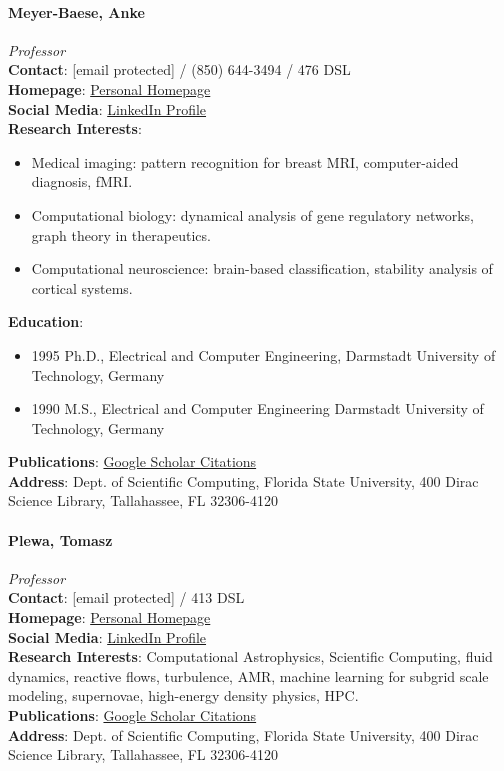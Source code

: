 \documentclass[12pt,a4paper]{article}
\begin{document}
\paragraph{Meyer-Baese, Anke}
\textit{Professor}\\
\textbf{Contact}: [email protected] / (850) 644-3494 / 476 DSL\\
\textbf{Homepage}: \href{http://www.sc.fsu.edu/~ameyerbaese/}{Personal Homepage}\\
\textbf{Social Media}: \href{https://www.linkedin.com/in/anke-meyer-baese-b4a1b87/}{LinkedIn Profile}\\
\textbf{Research Interests}:
\begin{itemize}
    \item Medical imaging: pattern recognition for breast MRI, computer-aided diagnosis, fMRI.
    \item Computational biology: dynamical analysis of gene regulatory networks, graph theory in therapeutics.
    \item Computational neuroscience: brain-based classification, stability analysis of cortical systems.
\end{itemize}
\textbf{Education}:
\begin{itemize}
    \item 1995 Ph.D., Electrical and Computer Engineering, Darmstadt University of Technology, Germany
    \item 1990 M.S., Electrical and Computer Engineering Darmstadt University of Technology, Germany
\end{itemize}
\textbf{Publications}: \href{https://scholar.google.com/citations?user=Y4fWz-sAAAAJ}{Google Scholar Citations}\\
\textbf{Address}: Dept. of Scientific Computing, Florida State University, 400 Dirac Science Library, Tallahassee, FL 32306-4120

\paragraph{Plewa, Tomasz}
\textit{Professor}\\
\textbf{Contact}: [email protected] / 413 DSL\\
\textbf{Homepage}: \href{http://plewa.sc.fsu.edu/}{Personal Homepage}\\
\textbf{Social Media}: \href{https://www.linkedin.com/in/tomasz-plewa-1b422a4/}{LinkedIn Profile}\\
\textbf{Research Interests}: Computational Astrophysics, Scientific Computing, fluid dynamics, reactive flows, turbulence, AMR, machine learning for subgrid scale modeling, supernovae, high-energy density physics, HPC.\\
\textbf{Publications}: \href{https://scholar.google.com/citations?user=7i-0zcAAAAAJ}{Google Scholar Citations}\\
\textbf{Address}: Dept. of Scientific Computing, Florida State University, 400 Dirac Science Library, Tallahassee, FL 32306-4120
\end{document}
